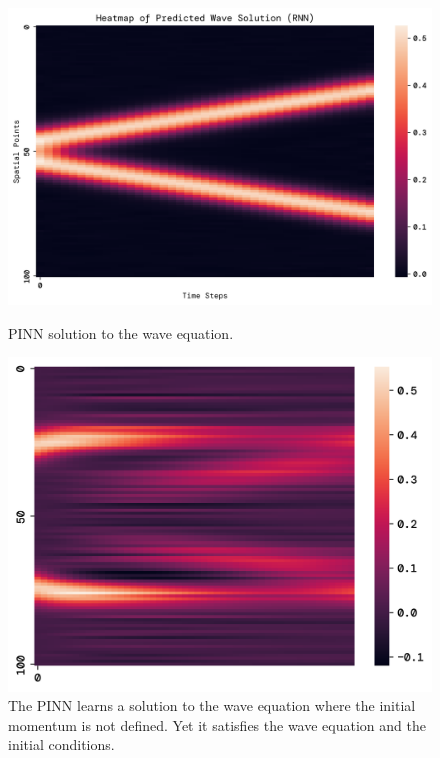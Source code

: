 \documentclass[twoside,11pt]{report}
\begin{document}
    \begin{figure}[!ht]
        \begin{minipage}[t]{0.5\textwidth - 1mm}
            \begin{center}
                \includegraphics[width=\textwidth]{../runsAndFigures/wave_rnn.png}
            \end{center}
            \caption
            {
                PINN solution to the wave equation.
            }\label{fig:wave_own_dnn}
        \end{minipage}
        \hspace{2mm}
        \begin{minipage}[t]{0.5\textwidth - 1mm}
            \begin{center}
                \includegraphics[width=\textwidth]{../runsAndFigures/wave_rnn_future.png}
            \end{center}
            \caption
            {
                The PINN learns a solution to the wave equation where the initial momentum is not defined.
                Yet it satisfies the wave equation and the initial conditions.
            }\label{fig:wave_tf_dnn}
        \end{minipage}
    \end{figure}
\end{document}
